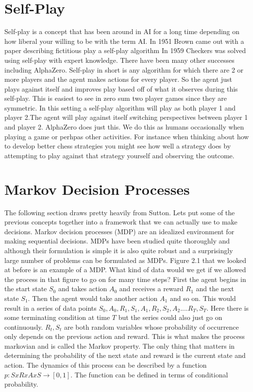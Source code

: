 \section{Self-Play}

Self-play is a concept that has been around in AI for a long time depending on how liberal your willing to be with the term AI. In 1951 Brown came out with a paper describing fictitious play a self-play algorithm In 1959 Checkers was solved using self-play with expert knowledge. There have been many other successes including AlphaZero. Self-play in short is any algorithm for which there are 2 or more players and the agent makes actions for every player. So the agent just plays against itself and improves play based off of what it observes during this self-play. This is easiest to see in zero sum two player games since they are symmetric. In this setting a self-play algorithm will play as both player 1 and player 2.The agent will play against itself switching perspectives between player 1 and player 2. AlphaZero does just this. We do this as humans occasionally when playing a game or perhpas other activities. For instance when thinking about how to develop better chess strategies you might see how well a strategy does by attempting to play against that strategy yourself and observing the outcome. 

\section{Markov Decision Processes}

The following section draws pretty heavily from Sutton. Lets put some of the previous concepts together into a framework that we can actually use to make decisions. Markov decision processes (MDP) are an idealized environment for making sequential decisions. MDPs have been studied quite thoroughly and although their formulation is simple it is also quite robust and a surprisingly large number of problems can be formulated as MDPs. Figure 2.1 that we looked at before is an example of a MDP. What kind of data would we get if we allowed the process in that figure to go on for many time steps? First the agent begins in the start state $S_{0}$ and takes action $A_{0}$ and receives a reward $R_{1}$ and the next state $S_{1}$. Then the agent would take another action $A_{1}$ and so on. This would result in a series of data points $S_{0},A_{0},R_{1},S_{1},A_{1},R_{2},S_{2},A_{2}....R_{T},S_{T}$. Here there is some terminating condition at time $T$ but the series could also just go on continuously. $R_{t},S_{t}$ are both random variables whose probability of occurrence only depends on the previous action and reward. This is what makes the process markovian and is called the Markov property. The only thing that matters in determining the probability of the next state and reward is the current state and action. The dynamics of this process can be described by a function $p: S x R x A x S \rightarrow [0,1] $. The function can be defined in terms of conditional probability. 

